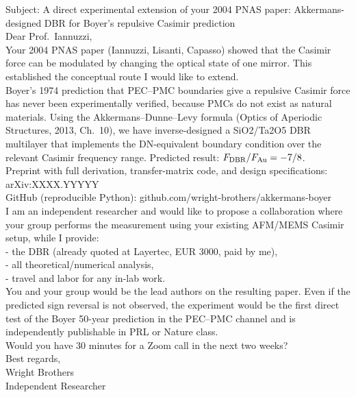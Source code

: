 \documentclass[11pt,a4paper]{article}
\begin{document}
\begin{tcolorbox}[colback=white,colframe=blue!50!black,title={英語メール例（カスタマイズ前）},breakable]
\small\ttfamily
Subject: A direct experimental extension of your 2004 PNAS paper:
Akkermans-designed DBR for Boyer's repulsive Casimir prediction\\

Dear Prof.\ Iannuzzi,\\

Your 2004 PNAS paper (Iannuzzi, Lisanti, Capasso) showed that the
Casimir force can be modulated by changing the optical state of one
mirror. This established the conceptual route I would like to extend.\\

Boyer's 1974 prediction that PEC--PMC boundaries give a repulsive
Casimir force has never been experimentally verified, because PMCs
do not exist as natural materials. Using the Akkermans--Dunne--Levy
formula (Optics of Aperiodic Structures, 2013, Ch.\ 10), we have
inverse-designed a SiO2/Ta2O5 DBR multilayer that implements the
DN-equivalent boundary condition over the relevant Casimir frequency
range. Predicted result: $F_{\rm DBR}/F_{\rm Au} = -7/8$.\\

Preprint with full derivation, transfer-matrix code, and design
specifications: arXiv:XXXX.YYYYY\\
GitHub (reproducible Python): github.com/wright-brothers/akkermans-boyer\\

I am an independent researcher and would like to propose a
collaboration where your group performs the measurement using your
existing AFM/MEMS Casimir setup, while I provide:\\
\hphantom{xx}- the DBR (already quoted at Layertec, EUR 3000, paid by me),\\
\hphantom{xx}- all theoretical/numerical analysis,\\
\hphantom{xx}- travel and labor for any in-lab work.\\

You and your group would be the lead authors on the resulting paper.
Even if the predicted sign reversal is not observed, the experiment
would be the first direct test of the Boyer 50-year prediction in
the PEC--PMC channel and is independently publishable in PRL or
Nature class.\\

Would you have 30 minutes for a Zoom call in the next two weeks?\\

Best regards,\\
Wright Brothers\\
Independent Researcher\\
[email address]\\
\end{tcolorbox}
\end{document}

